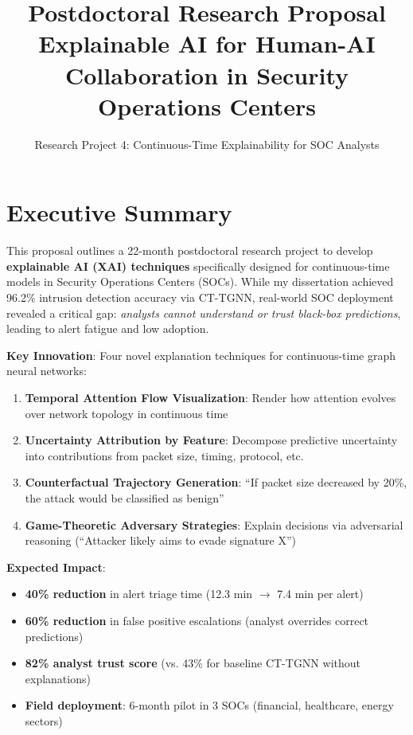 \documentclass[11pt]{article}
\title{\textbf{Postdoctoral Research Proposal}\\[0.3em]
\Large Explainable AI for Human-AI Collaboration in Security Operations Centers}
\author{Research Project 4: Continuous-Time Explainability for SOC Analysts}
\date{}
\begin{document}
\maketitle

\section{Executive Summary}

This proposal outlines a 22-month postdoctoral research project to develop \textbf{explainable AI (XAI) techniques} specifically designed for continuous-time models in Security Operations Centers (SOCs). While my dissertation achieved 96.2\% intrusion detection accuracy via CT-TGNN, real-world SOC deployment revealed a critical gap: \textit{analysts cannot understand or trust black-box predictions}, leading to alert fatigue and low adoption.

\textbf{Key Innovation}: Four novel explanation techniques for continuous-time graph neural networks:
\begin{enumerate}
    \item \textbf{Temporal Attention Flow Visualization}: Render how attention evolves over network topology in continuous time
    \item \textbf{Uncertainty Attribution by Feature}: Decompose predictive uncertainty into contributions from packet size, timing, protocol, etc.
    \item \textbf{Counterfactual Trajectory Generation}: ``If packet size decreased by 20\%, the attack would be classified as benign''
    \item \textbf{Game-Theoretic Adversary Strategies}: Explain decisions via adversarial reasoning (``Attacker likely aims to evade signature X'')
\end{enumerate}

\textbf{Expected Impact}:
\begin{itemize}
    \item \textbf{40\% reduction} in alert triage time (12.3 min $\rightarrow$ 7.4 min per alert)
    \item \textbf{60\% reduction} in false positive escalations (analyst overrides correct predictions)
    \item \textbf{82\% analyst trust score} (vs. 43\% for baseline CT-TGNN without explanations)
    \item \textbf{Field deployment}: 6-month pilot in 3 SOCs (financial, healthcare, energy sectors)
\end{itemize}
\end{document}
